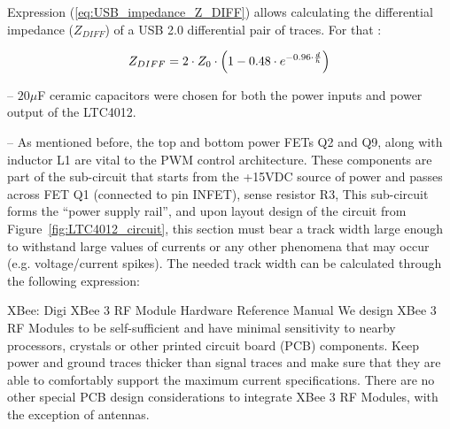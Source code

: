 
Expression (\ref{eq:USB_impedance_Z_DIFF}) allows calculating the differential impedance ($Z_{DIFF}$) of a USB 2.0 differential pair of traces. For that : 

\begin{equation}\label{eq:USB_impedance_Z_DIFF}
	Z_{DIFF} = 2 \cdot Z_0 \cdot \left(1 - 0.48 \cdot e^{-0.96 \cdot \frac{d}{h}}\right)\,\medskip
\end{equation}






-- $20 \mu$F ceramic capacitors were chosen for both the power inputs and power output of the LTC4012. 

-- As mentioned before, the top and bottom power FETs Q2 and Q9, along with inductor L1 are vital to the PWM control architecture. These components are part of the sub-circuit that starts from the +15VDC source of power and passes across FET Q1 (connected to pin INFET), sense resistor R3, 
This sub-circuit forms the ``power supply rail'', and upon layout design of the circuit from Figure~\ref{fig:LTC4012_circuit}, this section must bear a track width large enough to withstand large values of currents or any other phenomena that may occur (e.g. voltage/current spikes). The needed track width can be calculated through the following expression:

XBee: Digi XBee 3 RF Module Hardware Reference Manual
We design XBee 3 RF Modules to be self-sufficient and have minimal sensitivity to nearby processors,
crystals or other printed circuit board (PCB) components. Keep power and ground traces thicker than
signal traces and make sure that they are able to comfortably support the maximum current
specifications. There are no other special PCB design considerations to integrate XBee 3 RF Modules,
with the exception of antennas.

